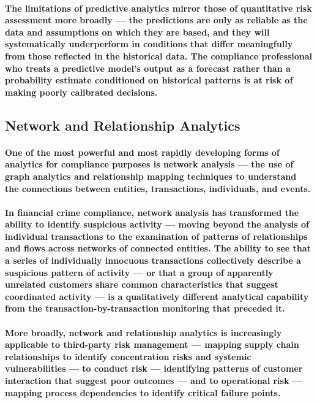 \paragraph{The limitations of predictive analytics mirror those of quantitative risk assessment more broadly — the predictions are only as reliable as the data and assumptions on which they are based, and they will systematically underperform in conditions that differ meaningfully from those reflected in the historical data. The compliance professional who treats a predictive model's output as a forecast rather than a probability estimate conditioned on historical patterns is at risk of making poorly calibrated decisions.}

\subsection{Network and Relationship Analytics}
\paragraph{One of the most powerful and most rapidly developing forms of analytics for compliance purposes is \textbf{network analysis} — the use of graph analytics and relationship mapping techniques to understand the connections between entities, transactions, individuals, and events.}
\paragraph{In financial crime compliance, network analysis has transformed the ability to identify suspicious activity — moving beyond the analysis of individual transactions to the examination of patterns of relationships and flows across networks of connected entities. The ability to see that a series of individually innocuous transactions collectively describe a suspicious pattern of activity — or that a group of apparently unrelated customers share common characteristics that suggest coordinated activity — is a qualitatively different analytical capability from the transaction-by-transaction monitoring that preceded it.}
\paragraph{More broadly, network and relationship analytics is increasingly applicable to third-party risk management — mapping supply chain relationships to identify concentration risks and systemic vulnerabilities — to conduct risk — identifying patterns of customer interaction that suggest poor outcomes — and to operational risk — mapping process dependencies to identify critical failure points.}

